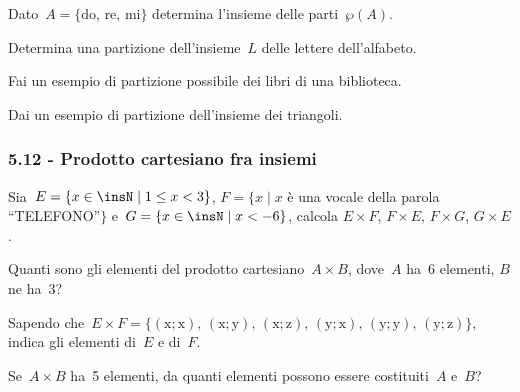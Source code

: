\begin{esercizio}
\label{ese:5.68}
Dato~$A=\{\text{do, re, mi}\}$ determina l'insieme delle parti~$\wp (A)$.
\end{esercizio}

\begin{esercizio}
 \label{ese:5.69}
 Determina una partizione dell'insieme~$L$ delle lettere dell'alfabeto.
\end{esercizio}

\begin{esercizio}
 \label{ese:5.70}
 Fai un esempio di partizione possibile dei libri di una biblioteca.
\end{esercizio}

\begin{esercizio}
 \label{ese:5.71}
 Dai un esempio di partizione dell'insieme dei triangoli.
\end{esercizio}

\subsubsection*{5.12 - Prodotto cartesiano fra insiemi}

\begin{esercizio} %
\label{ese:5.72}
Sia~$E=\{x\in\insN\mid 1\le x<3\}$, $F=\{x\mid x$ è una vocale della parola ``TELEFONO''$\}$ e~$G=\{x\in\insN\mid x<-6\}$, calcola $E\times F$,  $F\times E$,  $F\times G$,  $G\times E$.
\end{esercizio}

\begin{esercizio} %
 \label{ese:5.73}
Quanti sono gli elementi del prodotto cartesiano~$A\times B$, dove~$A$ ha~6 elementi, $B$ ne ha~3?
\end{esercizio}


\begin{esercizio}[\Ast] %
 \label{ese:5.74}
Sapendo che~$E\times F=\{(\text{x};\text{x})\text{, }(\text{x};\text{y})\text{, }(\text{x};\text{z})\text{, }(\text{y};\text{x})\text{, }(\text{y};\text{y})\text{, }(\text{y};\text{z})\}$, indica gli elementi di~$E$ e di~$F$.
\end{esercizio}

\begin{esercizio}[\Ast] %
 \label{ese:5.75}
Se~$A\times B$ ha~5 elementi, da quanti elementi possono essere costituiti~$A$ e~$B$?
\end{esercizio}

